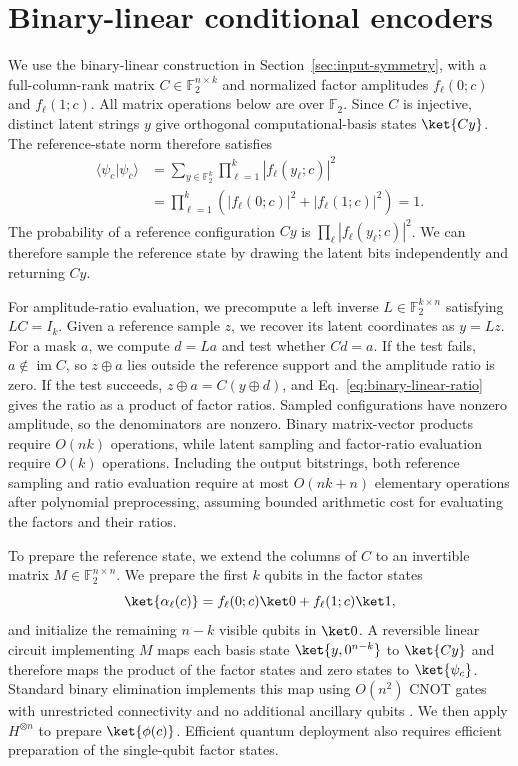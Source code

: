 \section{Binary-linear conditional encoders}
\label{app:binary-linear-encoders}

We use the binary-linear construction in Section~\ref{sec:input-symmetry}, with a full-column-rank matrix $C\in\mathbb F_2^{n\times k}$ and normalized factor amplitudes $f_\ell(0;c)$ and $f_\ell(1;c)$. All matrix operations below are over $\mathbb F_2$. Since $C$ is injective, distinct latent strings $y$ give orthogonal computational-basis states $\ket{Cy}$. The reference-state norm therefore satisfies
\begin{equation}
\begin{aligned}
 \langle\psi_c|\psi_c\rangle
 &=\sum_{y\in\mathbb F_2^k}
   \prod_{\ell=1}^{k}|f_\ell(y_\ell;c)|^2\\
 &=\prod_{\ell=1}^{k}
   \left(|f_\ell(0;c)|^2+|f_\ell(1;c)|^2\right)=1.
\end{aligned}
\end{equation}
The probability of a reference configuration $Cy$ is $\prod_\ell|f_\ell(y_\ell;c)|^2$. We can therefore sample the reference state by drawing the latent bits independently and returning $Cy$.

For amplitude-ratio evaluation, we precompute a left inverse $L\in\mathbb F_2^{k\times n}$ satisfying $LC=I_k$. Given a reference sample $z$, we recover its latent coordinates as $y=Lz$. For a mask $a$, we compute $d=La$ and test whether $Cd=a$. If the test fails, $a\notin\operatorname{im}C$, so $z\oplus a$ lies outside the reference support and the amplitude ratio is zero. If the test succeeds, $z\oplus a=C(y\oplus d)$, and Eq.~\eqref{eq:binary-linear-ratio} gives the ratio as a product of factor ratios. Sampled configurations have nonzero amplitude, so the denominators are nonzero. Binary matrix-vector products require $O(nk)$ operations, while latent sampling and factor-ratio evaluation require $O(k)$ operations. Including the output bitstrings, both reference sampling and ratio evaluation require at most $O(nk+n)$ elementary operations after polynomial preprocessing, assuming bounded arithmetic cost for evaluating the factors and their ratios.

To prepare the reference state, we extend the columns of $C$ to an invertible matrix $M\in\mathbb F_2^{n\times n}$. We prepare the first $k$ qubits in the factor states
\begin{equation}
 \ket{\alpha_\ell(c)}
 =f_\ell(0;c)\ket0+f_\ell(1;c)\ket1,
\end{equation}
and initialize the remaining $n-k$ visible qubits in $\ket0$. A reversible linear circuit implementing $M$ maps each basis state $\ket{y,0^{n-k}}$ to $\ket{Cy}$ and therefore maps the product of the factor states and zero states to $\ket{\psi_c}$. Standard binary elimination implements this map using $O(n^2)$ CNOT gates with unrestricted connectivity and no additional ancillary qubits \cite{patelOptimalSynthesisLinear2008}. We then apply $H^{\otimes n}$ to prepare $\ket{\phi(c)}$. Efficient quantum deployment also requires efficient preparation of the single-qubit factor states.
